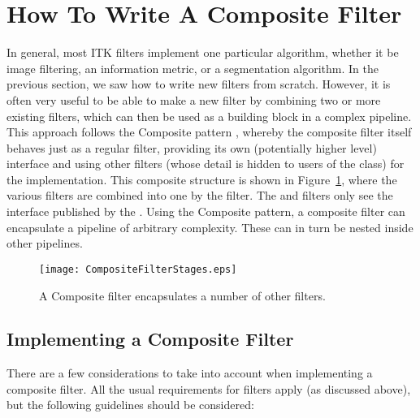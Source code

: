 
\section{How To Write A Composite Filter}

In general, most ITK filters implement one particular algorithm, whether it be
image filtering, an information metric, or a segmentation algorithm.  In the
previous section, we saw how to write new filters from scratch.  However, it is
often very useful to be able to make a new filter by combining two or more
existing filters, which can then be used as a building block in a complex
pipeline.  This approach follows the Composite pattern \cite{Gamma1995},
whereby the composite filter itself behaves just as a regular filter, providing
its own (potentially higher level) interface and using other filters (whose
detail is hidden to users of the class) for the implementation.  This composite
structure is shown in Figure~\ref{fig:CompositeFilterStages}, where the various
 filters are combined into one by the  filter.
The  and  filters only see the interface published by
the .  Using the Composite pattern, a composite filter can
encapsulate a pipeline of arbitrary complexity.  These can in turn be nested
inside other pipelines.

\begin{figure}
  \centering
  \texttt{[image: CompositeFilterStages.eps]}
  \caption{A Composite filter encapsulates a number of other filters.} 
  \label{fig:CompositeFilterStages}
\end{figure}

\subsection{Implementing a Composite Filter}

There are a few considerations to take into account when implementing a
composite filter.  All the usual requirements for filters apply (as
discussed above), but the following guidelines should be considered:

